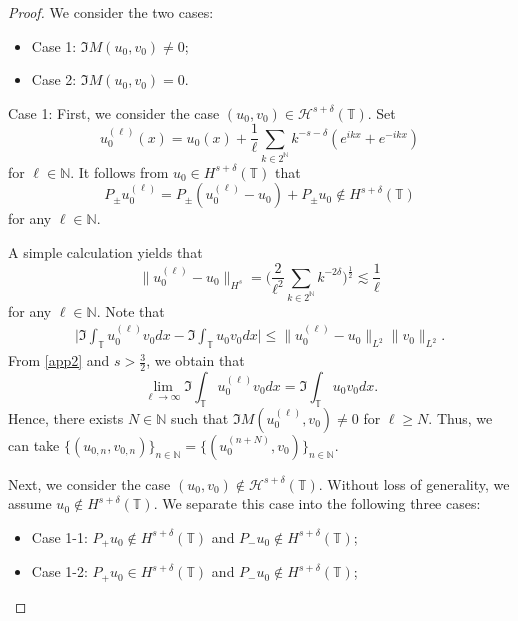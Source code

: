 \documentclass[10pt,a4paper]{amsart}
\renewcommand{\H}{\mathcal H}
\newcommand{\N}{\mathbb{N}}
\newcommand{\T}{\mathbb{T}}
\newcommand{\dl}{\delta}
\renewcommand{\l}{\ell}
\newcommand{\les}{\lesssim}
\begin{document}
\begin{proof}
We consider the two cases:
\begin{itemize}
\item Case 1: $\Im M(u_0, v_0) \neq 0$;
\item Case 2: $\Im M(u_0, v_0) = 0$.
\end{itemize}

Case 1: First, we consider the case $(u_0, v_0) \in \H^{s+\dl}(\T)$.
Set
\[
u_{0}^{(\l)}(x) = u_0 (x) + \frac 1\l \sum_{k \in 2^\N} k^{-s-\dl} (e^{i k x} + e^{-ikx})
\]
for $\l \in \N$.
It follows from $u_0 \in H^{s+\dl}(\T)$ that
\begin{equation*}
P_\pm u_0^{(\l)} = P_\pm (u_0^{(\l)} - u_0) + P_\pm u_0 \notin H^{s+\dl}(\T)
\end{equation*}
for any $\l \in \N$.

A simple calculation yields that
\begin{equation}
\| u_{0}^{(\l)} - u_0 \|_{H^s}
= \bigg( \frac 2{\l^2}  \sum_{k \in 2^{\N}} k^{-2\dl} \bigg)^{\frac 12}
\les \frac 1\l
\label{app2}
\end{equation}
for any $\l \in \N$.
Note that
\begin{align*}
\Big|
\Im \int_\T u_0^{(\l)} v_0 dx
- \Im \int_\T u_0 v_0 dx
\Big|
\le
\| u_{0}^{(\l)} - u_0 \|_{L^2} \|v_0\|_{L^2}.
\end{align*}
From \eqref{app2} and $s>\frac 32$,
we obtain that
\[
\lim_{\l \to \infty} \Im \int_\T u_{0}^{(\l)} v_0 dx
= \Im \int_\T u_0 v_0 dx.
\]
Hence, there exists $N \in \N$ such that $\Im M (u_{0}^{(\l)}, v_0) \neq 0$ for $\l \ge N$.
Thus, we can take $\{(u_{0, n}, v_{0, n})\}_{n \in \N} = \{(u_{0}^{(n+N)}, v_0)\}_{n \in \N}$.

Next, we consider the case $(u_0, v_0) \notin \H^{s+\dl}(\T)$.
Without loss of generality, we assume $u_0 \notin H^{s+\dl}(\T)$.
We separate this case into the following three cases:
\begin{itemize}
\item
Case 1-1:
$P_+ u_0 \notin H^{s+\dl}(\T)$ and $P_- u_0 \notin H^{s+\dl}(\T)$;

\item
Case 1-2:
$P_+ u_0 \in H^{s+\dl}(\T)$ and $P_- u_0 \notin H^{s+\dl}(\T)$;


\end{itemize}
\end{proof}
\end{document}
